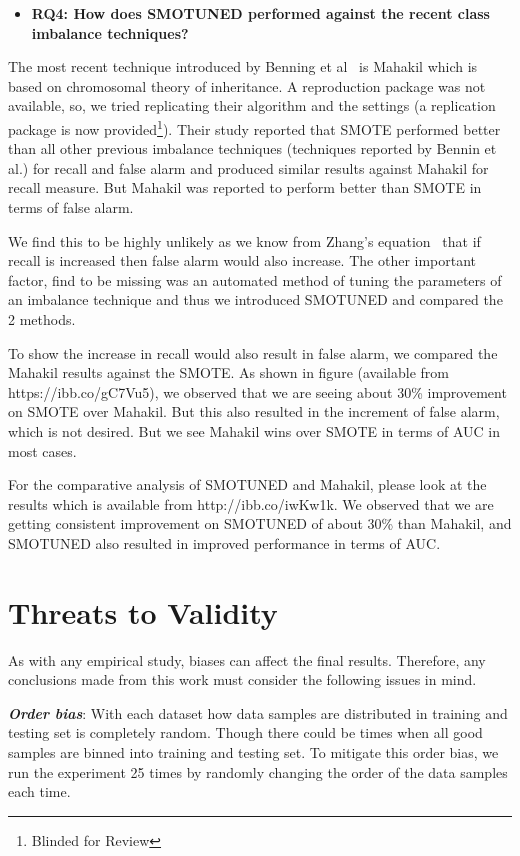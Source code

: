\documentclass[sigconf,review, anonymous]{acmart}
\newcommand{\bi}{\begin{itemize}[leftmargin=0.4cm]}
\newcommand{\ei}{\end{itemize}}
\theoremstyle{break}
\theoremstyle{break}
\newcommand{\sma}{{\sc SMOTE}}
\newcommand{\smb}{{\sc SMOTUNED}}
\begin{document}
\bi
\item{\bf RQ4: How does {\smb} performed against the recent class imbalance techniques?}
\ei

The most recent technique introduced by Benning et al~\cite{bennin2017mahakil} is Mahakil which is based on chromosomal theory of inheritance. A reproduction package was not available, so, we tried replicating their algorithm and the settings (a replication package is now provided\footnote{Blinded for Review}).
Their study reported that {\sma} performed better than all other previous imbalance techniques (techniques reported by Bennin et al.) for recall and false alarm and produced similar results against Mahakil for recall measure. But Mahakil was reported to perform better than {\sma} in terms of false alarm.

We find this to be highly unlikely as we know from Zhang's equation~\cite{zhang2007comments} that if recall is increased then false alarm would also increase. The other important factor, find to be missing was an automated method of tuning the parameters of an imbalance technique and thus we introduced {\smb} and compared the 2 methods.

To show the increase in recall would also result in false alarm, we compared the Mahakil results against the {\sma}. As shown in figure (available from https://ibb.co/gC7Vu5), we observed that we are seeing about 30\% improvement on {\sma} over Mahakil. But this also resulted in the increment of false alarm, which is not desired. But we see Mahakil wins over {\sma} in terms of AUC in most cases.

For the comparative analysis of {\smb} and Mahakil, please look at the results which is available from http://ibb.co/iwKw1k. We observed that we are getting consistent improvement on {\smb} of about 30\% than Mahakil, and {\smb} also resulted in improved performance in terms of AUC.

\section{Threats to Validity}
\label{sect:validity}

As with any empirical study, biases can affect the final
results. Therefore, any conclusions made from this work must consider the following issues in mind.

\textbf{\textit{Order bias}}: With each dataset how data samples are distributed in training and testing set is completely random. Though there could be times when all good samples are binned into training and testing set. To mitigate this order bias, we run
the experiment 25 times by randomly changing the order of the data samples each time.
\end{document}
